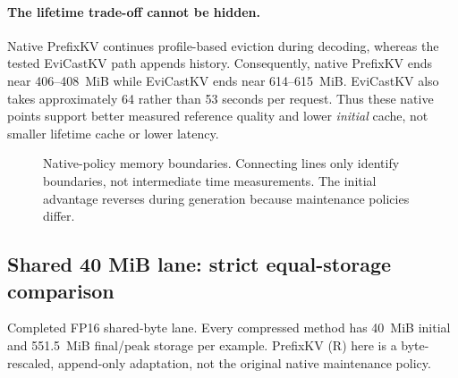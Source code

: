 \documentclass[10pt,letterpaper]{article}
\newcommand{\Evi}{EviCastKV}
\newcommand{\resulttable}[2]{\begin{center}\small\begin{adjustbox}{max width=#1}\end{adjustbox}\end{center}}
\begin{document}
\paragraph{The lifetime trade-off cannot be hidden.}
Native PrefixKV continues profile-based eviction during decoding, whereas
the tested \Evi{} path appends history. Consequently, native PrefixKV ends
near 406--408~MiB while \Evi{} ends near 614--615~MiB. \Evi{} also takes
approximately 64 rather than 53 seconds per request. Thus these native
points support better measured reference quality and lower \emph{initial}
cache, not smaller lifetime cache or lower latency.

\begin{figure}[htbp]
\centering
{}
\caption{Native-policy memory boundaries. Connecting lines only identify
boundaries, not intermediate time measurements. The initial advantage
reverses during generation because maintenance policies differ.}
\label{fig:boundaries}
\end{figure}

\subsection{Shared 40 MiB lane: strict equal-storage comparison}
\begin{table}[htbp]
\caption{Completed FP16 shared-byte lane. Every compressed method has
40~MiB initial and 551.5~MiB final/peak storage per example. PrefixKV (R)
here is a byte-rescaled, append-only adaptation, not the original native
maintenance policy.}
\label{tab:prefixshared}
\resulttable{\linewidth}{prefix_shared_byte_40mib}
\end{table}
\end{document}
